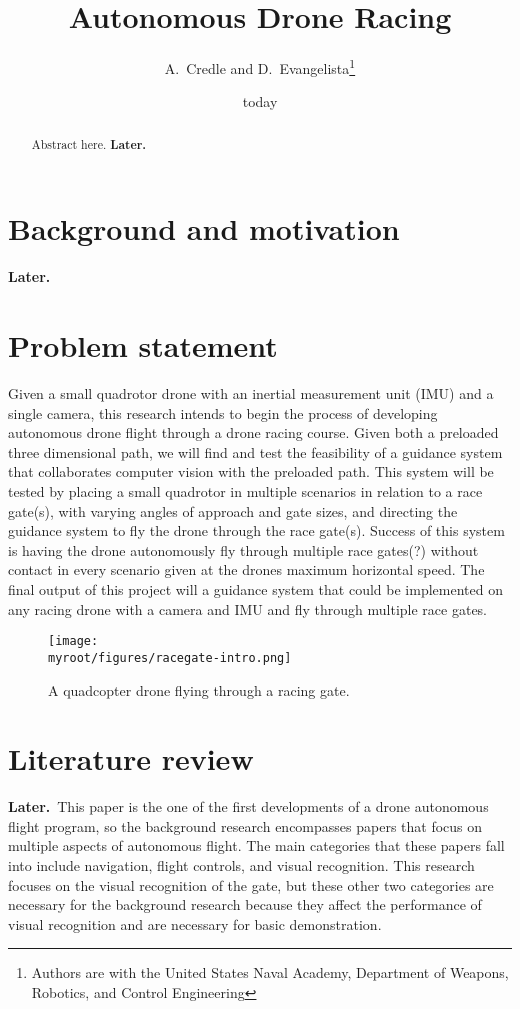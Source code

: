 \documentclass[onecolumn,10pt]{IEEEtran}
\title{Autonomous Drone Racing}
\author{A.~Credle and D.~Evangelista\thanks{Authors are with the United States Naval Academy, Department of Weapons, Robotics, and Control Engineering}}
\date{today}
\newcommand{\myroot}{../}
\newcommand{\Later}{\textbf{Later.}}
\begin{document}
\maketitle

\begin{abstract}
Abstract here. \Later
\end{abstract}

\section{Background and motivation}
\Later

\section{Problem statement}
Given a small quadrotor drone with an inertial measurement unit (IMU) and a single camera, this research intends to begin the process of developing autonomous drone flight through a drone racing course. Given both a preloaded three dimensional path,  we will find and test the feasibility of a guidance system that collaborates computer vision with the preloaded path. This system will be tested by placing a small quadrotor in multiple scenarios in relation to a race gate(s), with varying angles of approach and gate sizes, and directing the guidance system to fly the drone through the race gate(s). Success of this system is having the drone autonomously fly through multiple race gates(?) without contact in every scenario given at the drones maximum horizontal speed. The final output of this project will a guidance system that could be implemented on any racing drone with a camera and IMU and fly through multiple race gates. 
\begin{figure}[h]
\begin{center}
\texttt{[image: \\myroot/figures/racegate-intro.png]}
\end{center}
\caption{A quadcopter drone flying through a racing gate.}
\label{fig-problem-statement-1}
\end{figure}

\section{Literature review}
\Later\ This paper is the one of the first developments of a drone autonomous flight program, so the background research encompasses papers that focus on multiple aspects of autonomous flight. The main categories that these papers fall into include navigation, flight controls, and visual recognition. This research focuses on the visual recognition of the gate, but these other two categories are necessary for the background research because they affect the performance of visual recognition and are necessary for basic demonstration. 
\end{document}
